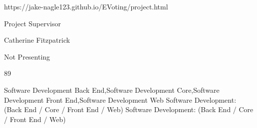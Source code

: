 \documentclass[twoside]{report}
\begin{document}
{https://jake-nagle123.github.io/EVoting/project.html}

{Project Supervisor}

{}

{Catherine Fitzpatrick}

{Not Presenting}

{89}

{Software Development Back End,Software Development Core,Software Development Front End,Software Development Web}
{Software Development: (Back End / Core / Front End / Web)}
{Software Development: (Back End / Core / Front End / Web)}

\endgroup

\DefaultLayout
\end{document}
